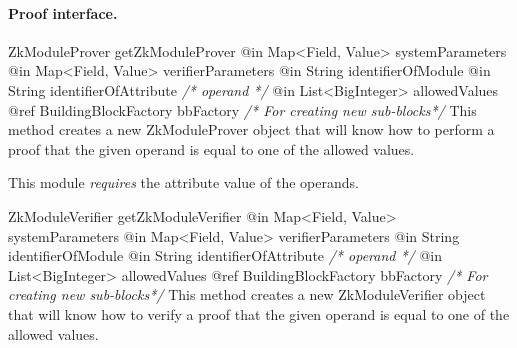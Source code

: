     \paragraph{Proof interface.}
      \begin{method}
      {ZkModuleProver}
      {getZkModuleProver}
      {
        {@in Map<Field, Value> systemParameters}
        {@in Map<Field, Value> verifierParameters}
        {@in String identifierOfModule}
        {@in String identifierOfAttribute \textrm{\emph{/* operand */}}}
        {@in List<BigInteger> allowedValues}
        {@ref BuildingBlockFactory bbFactory \textrm{\emph{/* For creating new sub-blocks*/}}}
      }
      This method creates a new ZkModuleProver object that will know how to
      perform a proof that the given operand is equal to one of the allowed values.

      This module \emph{requires} the attribute value of the operands.
      \end{method}
      \begin{method}
      {ZkModuleVerifier}
      {getZkModuleVerifier}
      {
        {@in Map<Field, Value> systemParameters}
        {@in Map<Field, Value> verifierParameters}
        {@in String identifierOfModule}
        {@in String identifierOfAttribute \textrm{\emph{/* operand */}}}
        {@in List<BigInteger> allowedValues}
        {@ref BuildingBlockFactory bbFactory \textrm{\emph{/* For creating new sub-blocks*/}}}
      }
      This method creates a new ZkModuleVerifier object that will know how to
      verify a proof that the given operand is equal to one of the allowed values.
      \end{method}

